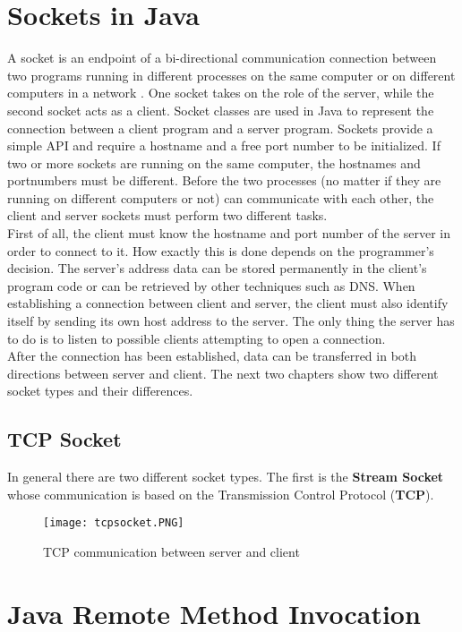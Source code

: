 \section{Sockets in Java}
A socket is an endpoint of a bi-directional communication connection between two programs running in different processes on the same computer or on different computers in a network . One socket takes on the role of the server, while the second socket acts as a client. Socket classes are used in Java to represent the connection between a client program and a server program. Sockets provide a simple API and require a hostname and a free port number to be initialized. If two or more sockets are running on the same computer, the hostnames and portnumbers must be different. Before the two processes (no matter if they are running on different computers or not) can communicate with each other, the client and server sockets must perform two different tasks.
\\
First of all, the client must know the hostname and port number of the server in order to connect to it. How exactly this is done depends on the programmer's decision. The server's address data can be stored permanently in the client's program code or can be retrieved by other techniques such as DNS. When establishing a connection between client and server, the client must also identify itself by sending its own host address to the server. The only thing the server has to do is to listen to possible clients attempting to open a connection.
\\
After the connection has been established, data can be transferred in both directions between server and client. The next two chapters show two different socket types and their differences.
\subsection{TCP Socket}
In general there are two different socket types. The first is the \textbf{Stream Socket} whose communication is based on the Transmission Control Protocol (\textbf{TCP}).
\begin{figure}[H]
	\centering
	\texttt{[image: tcpsocket.PNG]}
	\caption{TCP communication between server and client}
	\label{Wallet}
\end{figure}
\section{Java Remote Method Invocation}
